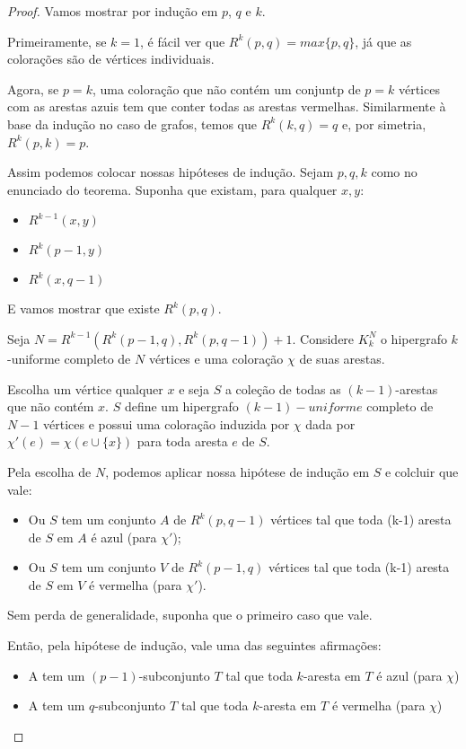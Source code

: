 \begin{proof}
    Vamos mostrar por indução em $p$, $q$ e $k$.

    Primeiramente, se $k=1$, é fácil ver que $R^k(p,q)=max\{p,q\}$, já que as colorações são de vértices individuais.

    Agora, se $p=k$, uma coloração que não contém um conjuntp de $p=k$ vértices com as arestas azuis tem que conter todas as arestas vermelhas. Similarmente à base da indução no caso de grafos, temos que $R^k(k,q)=q$ e, por simetria, $R^k(p,k)=p$.

    Assim podemos colocar nossas hipóteses de indução. Sejam $p,q,k$ como no enunciado do teorema. Suponha que existam, para qualquer $x,y$:
    \begin{itemize}
        \item $R^{k-1}(x,y)$
        \item $R^k(p-1,y)$
        \item $R^k(x,q-1)$
    \end{itemize}
    E vamos mostrar que existe $R^k(p,q)$.

    Seja $N=R^{k-1}(R^k(p-1,q),R^k(p,q-1))+1$. Considere $K^N_k$ o hipergrafo $k$-uniforme completo de $N$ vértices e uma coloração $\chi$ de suas arestas.

    Escolha um vértice qualquer $x$ e seja $S$ a coleção de todas as $(k-1)$-arestas que não contém $x$. $S$ define um hipergrafo $(k-1)-uniforme$ completo de $N-1$ vértices e possui uma coloração induzida por $\chi$ dada por $\chi'(e)=\chi(e\cup\{x\})$ para toda aresta $e$ de $S$. 
    
    Pela escolha de $N$, podemos aplicar nossa hipótese de indução em $S$ e colcluir que vale:
    \begin{itemize}
        \item Ou $S$ tem um conjunto $A$ de $R^k(p,q-1)$ vértices tal que toda (k-1) aresta de $S$ em $A$ é azul (para $\chi'$);
        \item Ou $S$ tem um conjunto $V$ de $R^k(p-1,q)$ vértices tal que toda (k-1) aresta de $S$ em $V$ é vermelha (para $\chi'$).
    \end{itemize}
    Sem perda de generalidade, suponha que o primeiro caso que vale.

    Então, pela hipótese de indução, vale uma das seguintes afirmações:
    \begin{itemize}
        \item A tem um $(p-1)$-subconjunto $T$ tal que toda $k$-aresta em $T$ é azul (para $\chi$)
        \item A tem um $q$-subconjunto $T$ tal que toda $k$-aresta em $T$ é vermelha (para $\chi$)
    \end{itemize}
\end{proof}

